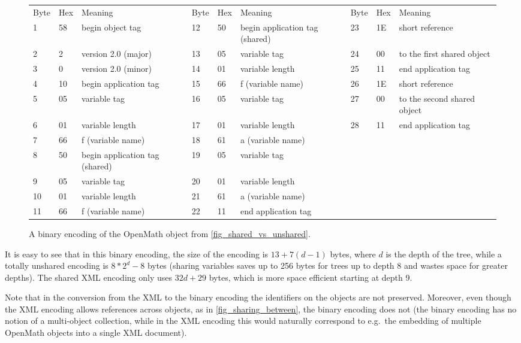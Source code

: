 \documentclass{report}
\def\OM{OpenMath\xspace}
\def\XML{XML\xspace}
\begin{document}
    
\begin{figure}\centering\footnotesize
  \begin{tabular}{lllllllll}
    Byte &Hex &Meaning &
    Byte &Hex &Meaning &
    Byte &Hex &Meaning \\
    1 &58 &begin object tag &
    12 &50 &begin application tag (shared) &
    23 &1E &short reference \\
    2 &2 & version 2.0 (major) &
    13 &05 &variable tag &
    24 &00 &to the first shared object \\
    3 &0 & version 2.0 (minor) &
    14 &01 &variable length &
    25 &11 &end application tag \\
    4 &10 &begin application tag &
    15 &66 &f  (variable name) &
    26 &1E &short reference \\
    5 &05 &variable tag &
    16 &05 &variable tag &
    27 &00 &to the second shared object \\
    6 &01 &variable length &
    17 &01 &variable length &
    28 &11 &end application tag \\
    7 &66 &f  (variable name) &
    18 &61 &a  (variable name) \\
    8 &50 &begin application tag (shared) &
    19 &05 &variable tag \\
    9 &05 &variable tag &
    20 &01 &variable length \\
    10 &01 &variable length &
    21 &61 &a  (variable name)\\
    11 &66 &f  (variable name) & 
    22 &11 &end application tag
  \end{tabular}
  \caption{A binary encoding of the \OM object from \ref{fig_shared_vs_unshared}.}\label{fig_bin-enc2}
\end{figure}    

It is easy to see that in this binary encoding, the size of the encoding is $13+7(d-1)$
bytes, where $d$ is the depth of the tree, while a totally unshared encoding is
$8\ast2^d-8$ bytes (sharing variables saves up to 256 bytes for trees up to depth 8 and
wastes space for greater depths). The shared \XML encoding only uses $32d+29$ bytes, which
is more space efficient starting at depth 9.
    
Note that in the conversion from the \XML to the binary encoding the identifiers on the
objects are not preserved. Moreover, even though the \XML encoding allows references
across objects, as in \ref{fig_sharing_between}, the binary encoding does not (the binary
encoding has no notion of a multi-object collection, while in the \XML encoding this would
naturally correspond to e.g.~the embedding of multiple \OM objects into a single \XML
document).
    
\end{document}
